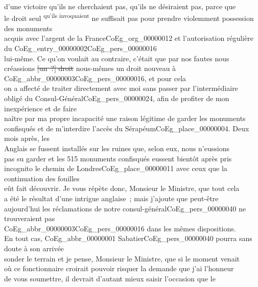 \documentclass{book}
\begin{document}
d’une victoire qu’ils ne cherchaient pas, qu’ils ne désiraient pas, parce que\\
{\small le droit seul \textsuperscript{qu’ils invoquaient} ne suffisait pas pour prendre violemment possession des monuments}\\
acquis avec l’argent de la France\gls{CoEg_org_00000012} et l’autorisation régulière du \gls{CoEg_entry_00000002}\gls{CoEg_pers_00000016}\\
lui-même. Ce qu’on voulait au contraire, c’était que par nos fautes nous\\
créassions \sout{[un~?] droit} nous-mêmes un droit nouveau à \gls{CoEg_abbr_00000003}\gls{CoEg_pers_00000016}, et pour cela\\
on a affecté de traiter directement avec moi sans passer par l’intermédiaire\\
obligé du Consul-Général\gls{CoEg_pers_00000024}, afin de profiter de mon inexpérience et de faire\\
naître par ma propre incapacité une raison légitime de garder les monuments\\
confisqués et de m’interdire l’accès du Sérapéum\gls{CoEg_place_00000004}. Deux mois après, les\\
Anglais se fussent installés sur les ruines que, selon eux, nous n’eussions\\
pas su garder et les 515 monuments confisqués eussent bientôt après pris\\
incognito le chemin de Londres\gls{CoEg_place_00000011} avec ceux que la continuation des fouilles\\
eût fait découvrir. Je vous répète donc, Monsieur le Ministre, que tout cela\\
a été le résultat d’une intrigue anglaise~; mais j’ajoute que peut-être\\
aujourd’hui les réclamations de notre consul-général\gls{CoEg_pers_00000040} ne trouveraient pas\\
\gls{CoEg_abbr_00000003}\gls{CoEg_pers_00000016} dans les mêmes dispositions.\\
\indent En tout cas, \gls{CoEg_abbr_00000001} Sabatier\gls{CoEg_pers_00000040} pourra sans doute à son arrivée\\
sonder le terrain et je pense, Monsieur le Ministre, que si le moment venait\\
où ce fonctionnaire croirait pouvoir risquer la demande que j’ai l’honneur\\
de vous soumettre, il devrait d’autant mieux saisir l’occasion que le\\
\end{document}
